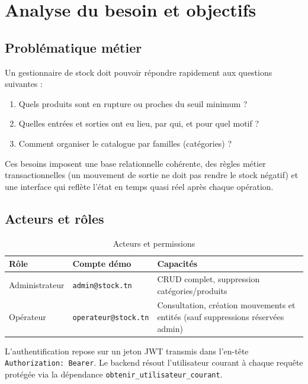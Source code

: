 \chapter{Analyse du besoin et objectifs}
\label{ch:besoin}

\section{Problématique métier}

Un gestionnaire de stock doit pouvoir répondre rapidement aux questions suivantes :
\begin{enumerate}
  \item Quels produits sont en rupture ou proches du seuil minimum ?
  \item Quelles entrées et sorties ont eu lieu, par qui, et pour quel motif ?
  \item Comment organiser le catalogue par familles (catégories) ?
\end{enumerate}

Ces besoins imposent une base relationnelle cohérente, des règles métier transactionnelles (un mouvement de sortie ne doit pas rendre le stock négatif) et une interface qui reflète l'état en temps quasi réel après chaque opération.

\section{Acteurs et rôles}

\begin{table}[htbp]
  \centering
  \caption{Acteurs et permissions}
  \label{tab:acteurs}
  \begin{tabular}{@{}llp{7cm}@{}}
    \toprule
    \textbf{Rôle} & \textbf{Compte démo} & \textbf{Capacités} \\
    \midrule
    Administrateur & \texttt{admin@stock.tn} & CRUD complet, suppression catégories/produits \\
    Opérateur & \texttt{operateur@stock.tn} & Consultation, création mouvements et entités (sauf suppressions réservées admin) \\
    \bottomrule
  \end{tabular}
\end{table}

L'authentification repose sur un jeton JWT transmis dans l'en-tête \texttt{Authorization: Bearer}. Le backend résout l'utilisateur courant à chaque requête protégée via la dépendance \texttt{obtenir\_utilisateur\_courant}.

